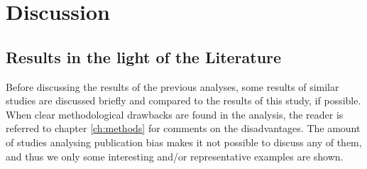 \documentclass[11pt,a4paper,twoside]{book}\usepackage[]{graphicx}\usepackage[]{color}
\begin{document}
% 












\chapter{Discussion} \label{ch:Discussion}

\section{Results in the light of the Literature}\label{sec:discussion.results}

Before discussing the results of the previous analyses, some results of similar studies are discussed briefly and compared to the results of this study, if possible.
When clear methodological drawbacks are found in the analysis, the reader is referred to chapter \ref{ch:methods} for comments on the disadvantages. The amount of studies analysing publication bias makes it not possible to discuss any of them, and thus we only some interesting and/or representative examples are shown.
\end{document}
